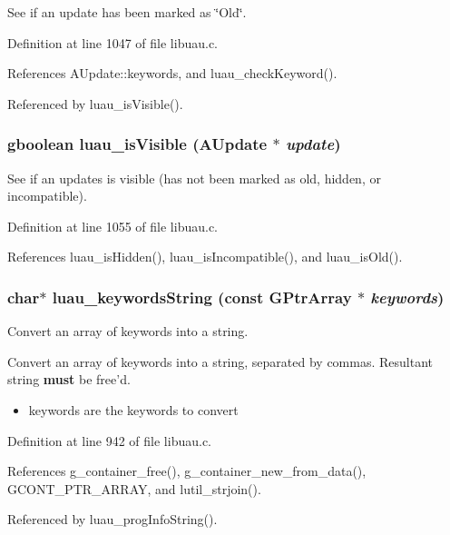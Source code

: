 See if an update has been marked as \char`\"{}Old\char`\"{}. 



Definition at line 1047 of file libuau.c.

References AUpdate::keywords, and luau\_\-check\-Keyword().

Referenced by luau\_\-is\-Visible().
\subsubsection{\setlength{\rightskip}{0pt plus 5cm}gboolean luau\_\-is\-Visible ({\bf AUpdate} $\ast$ {\em update})}\label{libuau_8c_a37}


See if an updates is visible (has not been marked as old, hidden, or incompatible). 



Definition at line 1055 of file libuau.c.

References luau\_\-is\-Hidden(), luau\_\-is\-Incompatible(), and luau\_\-is\-Old().
\subsubsection{\setlength{\rightskip}{0pt plus 5cm}char$\ast$ luau\_\-keywords\-String (const GPtr\-Array $\ast$ {\em keywords})}\label{libuau_8c_a30}


Convert an array of keywords into a string. 

Convert an array of keywords into a string, separated by commas. Resultant string {\bf must} be free'd.

\begin{itemize}
\item keywords are the keywords to convert 
\end{itemize}


Definition at line 942 of file libuau.c.

References g\_\-container\_\-free(), g\_\-container\_\-new\_\-from\_\-data(), GCONT\_\-PTR\_\-ARRAY, and lutil\_\-strjoin().

Referenced by luau\_\-prog\-Info\-String().
